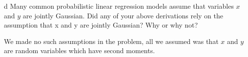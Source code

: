 \documentclass[expanded]{lkx_pset}
\begin{document}
\begin{parts}
  \begin{part}{d}
    Many common probabilistic linear regression models assume that
    variables $x$ and $y$ are jointly Gaussian.  Did any of your above
    derivations rely on the assumption that x and y are jointly
    Gaussian?  Why or why not?
  \end{part}

  We made no such assumptions in the problem, all we assumed was that $x$ and $y$ are random variables which have second moments.
\end{parts}
\end{document}
